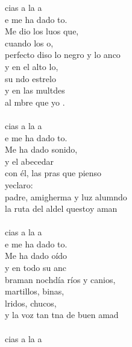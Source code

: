 \begin{cancion}%
	cias a la a \\
	e me ha dado to.\\
	Me dio los luos que, \\
	cuando los o,\\
	perfecto diso lo negro y lo anco\\
	y en el alto lo, \\
	su ndo estrelo\\
	y en las multdes\\
	al mbre que yo .\\
	\jump\\
	cias a la a \\
	e me ha dado to.\\
	Me ha dado sonido, \\
	y el abecedar\\
	con él, las pras que pienso \\
	yeclaro:\\
	padre, amigherma y luz alumndo\\
	la ruta del aldel questoy aman\\
	\jump\\
	cias a la a \\
	e me ha dado to.\\
	Me ha dado oído\\
	y en todo su anc\\
	braman nochdía ríos y canios,\\
	martillos, binas, \\
	lridos, chucos,\\
	y la voz tan tna de  buen amad\\
	\jump\\
	cias a la a \\

\end{cancion}
